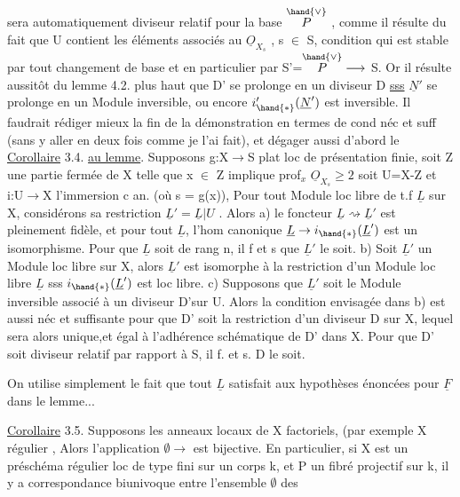 
sera automatiquement diviseur relatif pour la base $\overset{\hand{\vee}}{P}$ , comme il
résulte du fait que U contient les éléments associés au $\underline{O}_{X_s}$ , s $\in$ S,
condition qui est stable par tout changement de base et en particulier
par S'=$\overset{\hand{\vee}}{P} \longrightarrow$ S. Or il résulte aussitôt du lemme 4.2. plus haut que D' se
prolonge en un diviseur  D \uline{sss} $\underline{N}'$ se prolonge en un Module
inversible, ou encore $i'_{\hand{*}}(\underline{N}')$ est inversible.  Il faudrait rédiger
mieux la fin de la démonstration en termes de cond néc et suff (sans y
aller en deux fois comme je l'ai fait), et dégager aussi d'abord le
\uline{Corollaire} 3.4. \uline{au lemme}. Supposons g:X$\to$S plat loc de présentation finie,
soit Z une partie fermée de X telle que x $\in$ Z implique prof$_x$ $\underline{O}_{X_s} \geq 2$
soit U=X-Z et i:U$\to$X l'immersion c an.
(où s = g(x)), 
 Pour tout Module loc libre de t.f $\underline{L}$ sur X,
considérons sa restriction $\underline{L}' = \underline{L}|U$ . Alors a) le foncteur $\underline{L} \rightsquigarrow \underline{L}'$ est
pleinement fidèle, et pour  tout $\underline{L}$, 
l'hom canonique $\underline{L} \to i_{\hand{*}}(\underline{L}')$ est un isomorphisme. Pour que $\underline{L}$ soit de rang n, il f et s que $\underline{L}'$ le soit. \hand{(} b) Soit $\underline{L}'$ un
Module loc libre sur X, alors $\underline{L}'$ est isomorphe à la restriction d'un
Module loc libre $\underline{L}$ sss $i_{\hand{*}}(\underline{L}')$ est loc libre. c) Supposons que $\underline{L}'$ soit
le Module inversible associé à un diviseur  D'\hand{/}sur U. Alors
la condition envisagée dans b) est aussi néc et suffisante pour que D'
soit la restriction d'un diviseur  D sur X, lequel sera alors unique,et égal à l'adhérence schématique de D' dans X. \hand{|} Pour que D' soit
diviseur  relatif par rapport à S, il f. et s.  D le soit.

On utilise simplement le fait que tout $\underline{L}$ satisfait aux 
hypothèses énoncées pour $\underline{F}$ dans le lemme...

\uline{Corollaire} 3.5. Supposons les anneaux locaux de X factoriels, (par exemple X régulier\hand{)} , Alors l'application $\emptyset \to$  est bijective. En particulier, si X est
un préschéma régulier loc de type fini sur un corps k, et P un fibré
projectif sur k, il y a correspondance biunivoque entre l'ensemble $\emptyset$ des

